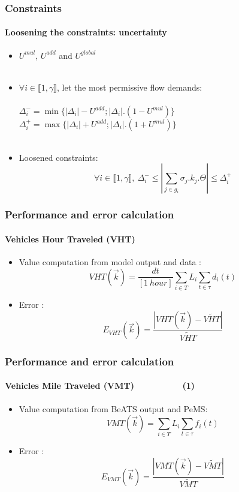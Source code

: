 \documentclass[fleqn]{beamer}
\begin{document}
\begin{frame}
	\frametitle{Constraints}
	\framesubtitle{Loosening the constraints: uncertainty}
	\begin{itemize}
		\item $U^{mul}$, $U^{add}$ and $U^{global}$\\
		~\\
		\item $\forall i \in {\llbracket 1,\gamma \rrbracket}$, let the most permissive flow demands:\\
		~\\
		$\Delta_{i}^{-}=\min{\{|\Delta_{i}|-U^{add};|\Delta_{i}|.(1-U^{mul})\}}$\\
		$\Delta_{i}^{+}=\max{\{|\Delta_{i}|+U^{add};|\Delta_{i}|.(1+U^{mul})\}}$\\
		~\\
		\item Loosened constraints: 
			\begin{equation*}
			\forall i\in \llbracket 1,\gamma \rrbracket,\ \Delta_{i}^{-}\leq |\sum\limits_{j\in g_{i}}\sigma_{j}.k_{j}.\Theta| \leq \Delta_{i}^{+}
			\end{equation*}
	\end{itemize}

\end{frame}


\begin{frame}
	\frametitle{Performance and error calculation}
	\framesubtitle{Vehicles Hour Traveled (VHT)}
	\begin{itemize}
		\item Value computation from model output and data : 
		\begin{equation*}
				 VHT(\vec{k})=\frac{dt}{[1\ hour]}\sum_{i\in{T}}L_{i}\sum_{t\in \tau}d_{i}(t)
		\end{equation*}
		\item Error : 
		\begin{equation*}
			E_{VHT}(\vec{k})=\frac{|VHT(\vec{k})-\widetilde{VHT}|}{\widetilde{VHT}}
		\end{equation*}
	\end{itemize}
\end{frame}

\begin{frame}
	\frametitle{Performance and error calculation}
	\framesubtitle{Vehicles Mile Traveled (VMT)~~~~~~~~~~(1)}
	\begin{itemize}
		\item Value computation from BeATS output and PeMS: 
		\begin{equation*}
			 VMT(\vec{k})=\sum_{i\in{T}}L_{i}\sum_{t\in \tau}f_{i}(t)
		\end{equation*}
		\item Error : 
		\begin{equation*}
			E_{VMT}(\vec{k})=\frac{|VMT(\vec{k})-\widetilde{VMT}|}{\widetilde{VMT}}
		\end{equation*}
 	\end{itemize}
\end{frame}
\end{document}

